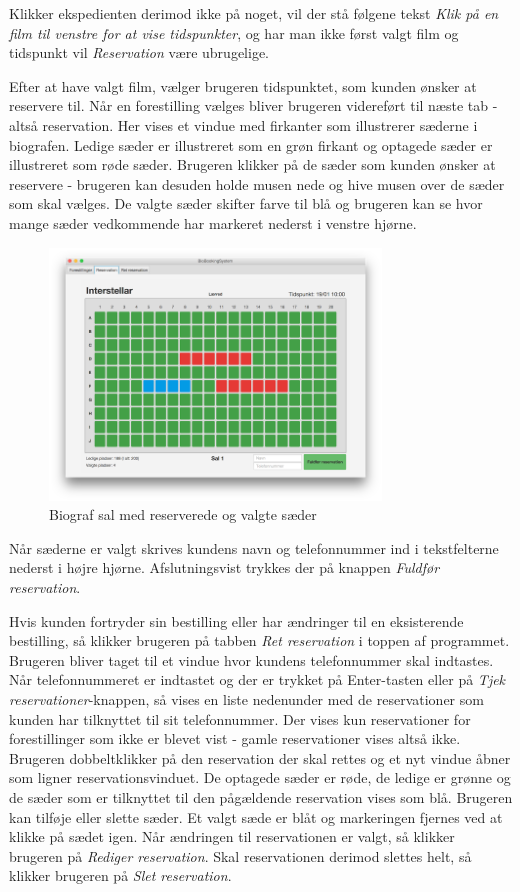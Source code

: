 \documentclass[final]{report}
\begin{document}
Klikker ekspedienten derimod ikke på noget, vil der stå følgene tekst \emph{Klik på en film til venstre for at vise tidspunkter}, og har man ikke først valgt film og tidspunkt vil \emph{Reservation} være ubrugelige.

Efter at have valgt film, vælger brugeren tidspunktet, som kunden ønsker at reservere til. Når en forestilling vælges bliver brugeren videreført til næste tab - altså reservation. Her vises et vindue med firkanter som illustrerer sæderne i biografen. Ledige sæder er illustreret som en grøn firkant og optagede sæder er illustreret som røde sæder. Brugeren klikker på de sæder som kunden ønsker at reservere - brugeren kan desuden holde musen nede og hive musen over de sæder som skal vælges. De valgte sæder skifter farve til blå og brugeren kan se hvor mange sæder vedkommende har markeret nederst i venstre hjørne. 

\begin{figure}[h]
    \centering
    \includegraphics[width=250pt]{3.png}
    \caption{Biograf sal med reserverede og valgte sæder}
\end{figure}

Når sæderne er valgt skrives kundens navn og telefonnummer ind i tekstfelterne nederst i højre hjørne. Afslutningsvist trykkes der på knappen \emph{Fuldfør reservation}. 

Hvis kunden fortryder sin bestilling eller har ændringer til en eksisterende bestilling, så klikker brugeren på tabben \emph{Ret reservation} i toppen af programmet. Brugeren bliver taget til et vindue hvor kundens telefonnummer skal indtastes. Når telefonnummeret er indtastet og der er trykket på Enter-tasten eller på \emph{Tjek reservationer}-knappen, så vises en liste nedenunder med de reservationer som kunden har tilknyttet til sit telefonnummer. Der vises kun reservationer for forestillinger som ikke er blevet vist - gamle reservationer vises altså ikke. Brugeren dobbeltklikker på den reservation der skal rettes og et nyt vindue åbner som ligner reservationsvinduet. De optagede sæder er røde, de ledige er grønne og de sæder som er tilknyttet til den pågældende reservation vises som blå. Brugeren kan tilføje eller slette sæder. Et valgt sæde er blåt og markeringen fjernes ved at klikke på sædet igen. Når ændringen til reservationen er valgt, så klikker brugeren på \emph{Rediger reservation}. Skal reservationen derimod slettes helt, så klikker brugeren på \emph{Slet reservation}.
\end{document}
